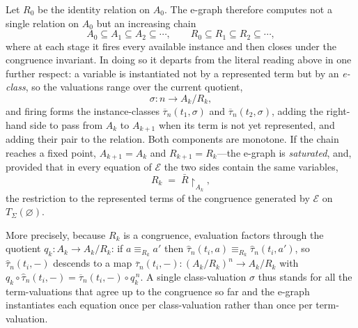 Let $R_0$ be the identity relation on $A_0$.
The e-graph therefore computes not a single relation on $A_0$ but an
increasing chain
\[
A_0 \subseteq A_1 \subseteq A_2 \subseteq \cdots,
\qquad
R_0 \subseteq R_1 \subseteq R_2 \subseteq \cdots,
\]
where at each stage it fires every available instance and then closes
under the congruence invariant. In doing so it departs from the literal
reading above in one further respect: a variable is instantiated not by
a represented term but by an \emph{e-class}, so the valuations range over
the current quotient,
\[
\sigma : n \longrightarrow A_k / R_k ,
\]
and firing forms the instance-classes $\overline{\tau}_n(t_1, \sigma)$
and $\overline{\tau}_n(t_2, \sigma)$, adding the right-hand side to pass
from $A_k$ to $A_{k+1}$ when its term is not yet represented, and adding
their pair to the relation. Both components are monotone. If the chain
reaches a fixed point, $A_{k+1} = A_k$ and $R_{k+1} = R_k$---the e-graph
is \emph{saturated}, and, provided that in
every equation of $\mathcal{E}$ the two sides contain the same variables,
\[
R_k \;=\; \bar R \!\restriction_{A_k},
\]
the restriction to the represented terms of the congruence generated by
$\mathcal{E}$ on $T_\Sigma(\varnothing)$.

More precisely, because
$R_k$ is a congruence, evaluation factors through the quotient
$q_k : A_k \to A_k/R_k$: if $a \equiv_{R_k} a'$ then $\hat{\tau}_n(t_i,
a) \equiv_{R_k} \hat{\tau}_n(t_i, a')$, so $\hat{\tau}_n(t_i, -)$
descends to a map $\overline{\tau}_n(t_i, -) : (A_k/R_k)^n \to A_k/R_k$
with $q_k \circ \hat{\tau}_n(t_i, -) = \overline{\tau}_n(t_i, -) \circ
q_k^{\,n}$. A single class-valuation $\sigma$ thus stands for all the
term-valuations that agree up to the congruence so far and the e-graph instantiates each equation
once per class-valuation rather than once per term-valuation.

